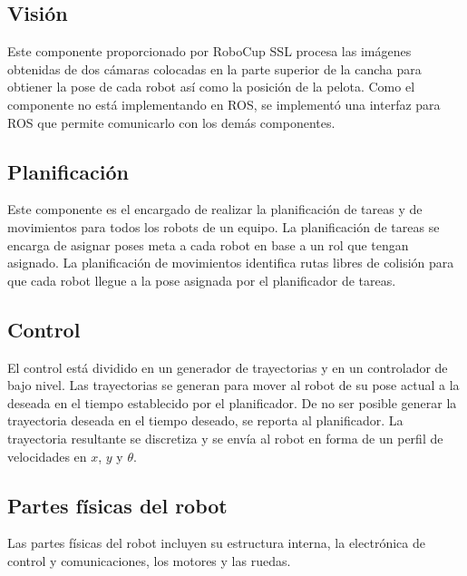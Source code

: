 \documentclass[twocolumn,10pt]{amrob}
\begin{document}
\subsection*{Visión}
Este componente proporcionado por RoboCup SSL procesa las imágenes obtenidas de dos cámaras colocadas en la parte superior de la cancha para obtiener la pose de cada robot así como la posición de la pelota. Como el componente no está implementando en ROS, se implementó una interfaz para ROS que permite comunicarlo con los demás componentes.

\subsection*{Planificación}
Este componente es el encargado de realizar la planificación de tareas y de movimientos para todos los robots de un equipo. La planificación de tareas se encarga de asignar poses meta a cada robot en base a un rol que tengan asignado. La planificación de movimientos identifica rutas libres de colisión para que cada robot llegue a la pose asignada por el planificador de tareas.
\subsection*{Control}
El control está dividido en un generador de trayectorias y en un controlador de bajo nivel. Las trayectorias se generan para mover al robot de su pose actual a la deseada en el tiempo establecido por el planificador. De no ser posible generar la trayectoria deseada en el tiempo deseado, se reporta al planificador. La trayectoria resultante se discretiza y se envía al robot en forma de un perfil de velocidades en $x$, $y$ y $\theta$. 
 
\subsection*{Partes físicas del robot}
Las partes físicas del robot incluyen su estructura interna, la electrónica de control y comunicaciones, los motores y las ruedas.
\end{document}

